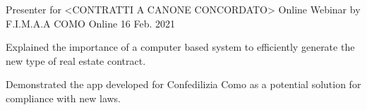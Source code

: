 

\begin{cventries}

  \cventry
  {Presenter for <CONTRATTI A CANONE CONCORDATO>} %
  {Online Webinar by F.I.M.A.A COMO} %
  {Online} %
  {16 Feb. 2021} %
  {
    \begin{cvitems} %
      \item {Explained the importance of a computer based system to efficiently generate the new type of real estate contract.}
      \item {Demonstrated the app developed for Confedilizia Como as a potential solution for compliance with new laws.}
    \end{cvitems}
  }

\end{cventries}
